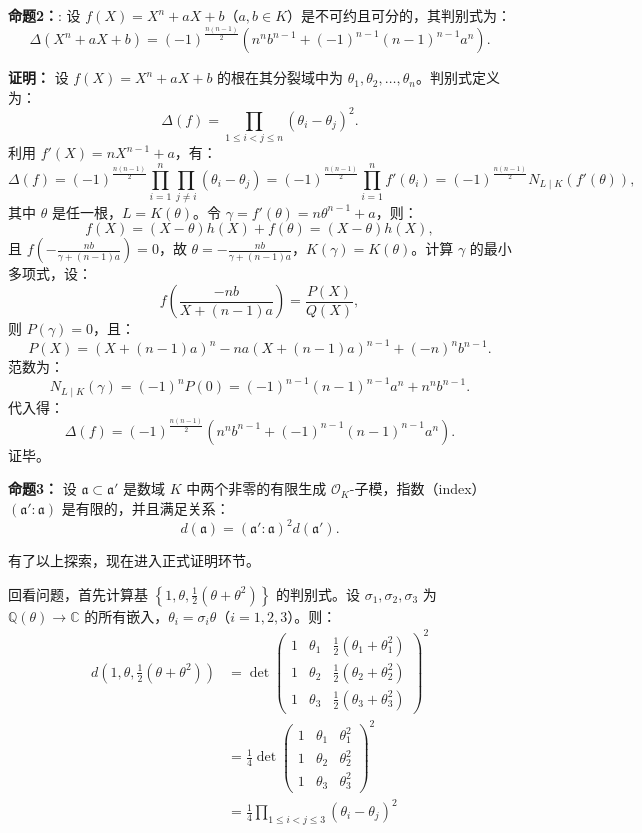 \documentclass[UTF8]{ctexart}
\begin{document}
\begin{enumerate}
\textbf{命题2：}: 设 \( f(X) = X^n + aX + b \)（\( a, b \in K \)）是不可约且可分的，其判别式为：
\[
\Delta(X^n + aX + b) = (-1)^{\frac{n(n-1)}{2}} \left( n^n b^{n-1} + (-1)^{n-1} (n-1)^{n-1} a^n \right).
\]

\textbf{证明：} 设 \( f(X) = X^n + aX + b \) 的根在其分裂域中为 \( \theta_1, \theta_2, \ldots, \theta_n \)。判别式定义为：
\[
\Delta(f) = \prod_{1 \leqslant i < j \leqslant n} (\theta_i - \theta_j)^2.
\]
利用 \( f'(X) = n X^{n-1} + a \)，有：
\[
\Delta(f) = (-1)^{\frac{n(n-1)}{2}} \prod_{i=1}^n \prod_{j \neq i} (\theta_i - \theta_j) = (-1)^{\frac{n(n-1)}{2}} \prod_{i=1}^n f'(\theta_i) = (-1)^{\frac{n(n-1)}{2}} N_{L \mid K}(f'(\theta)),
\]
其中 \( \theta \) 是任一根，\( L = K(\theta) \)。令 \( \gamma = f'(\theta) = n \theta^{n-1} + a \)，则：
\[
f(X) = (X - \theta) h(X) + f(\theta) = (X - \theta) h(X),
\]
且 \( f\left(-\frac{n b}{\gamma + (n-1) a}\right) = 0 \)，故 \( \theta = -\frac{n b}{\gamma + (n-1) a} \)，\( K(\gamma) = K(\theta) \)。计算 \( \gamma \) 的最小多项式，设：
\[
f\left(\frac{-n b}{X + (n-1) a}\right) = \frac{P(X)}{Q(X)},
\]
则 \( P(\gamma) = 0 \)，且：
\[
P(X) = (X + (n-1) a)^n - n a (X + (n-1) a)^{n-1} + (-n)^n b^{n-1}.
\]
范数为：
\[
N_{L \mid K}(\gamma) = (-1)^n P(0) = (-1)^{n-1} (n-1)^{n-1} a^n + n^n b^{n-1} .
\]
代入得：
\[
\Delta(f) = (-1)^{\frac{n(n-1)}{2}} \left( n^n b^{n-1} + (-1)^{n-1} (n-1)^{n-1} a^n \right).
\]
证毕。

\textbf{命题3：} 设 \(\mathfrak{a} \subset \mathfrak{a}' \) 是数域 \( K \) 中两个非零的有限生成 \(\mathcal{O}_K\)-子模，指数（index） \( (\mathfrak{a}' : \mathfrak{a}) \) 是有限的，并且满足关系：
\[
d(\mathfrak{a}) = (\mathfrak{a}' : \mathfrak{a})^2 d(\mathfrak{a}').
\]


有了以上探索，现在进入正式证明环节。

回看问题，首先计算基 \(\left\{1, \theta, \frac{1}{2}(\theta + \theta^2)\right\}\) 的判别式。设 \(\sigma_1, \sigma_2, \sigma_3\) 为 \(\mathbb{Q}(\theta) \to \mathbb{C}\) 的所有嵌入，\(\theta_i = \sigma_i \theta\)（\(i = 1, 2, 3\)）。则：
\[
\begin{aligned}
d\left(1, \theta, \frac{1}{2}(\theta + \theta^2)\right) &= \det\begin{pmatrix}
1 & \theta_1 & \frac{1}{2}(\theta_1 + \theta_1^2) \\
1 & \theta_2 & \frac{1}{2}(\theta_2 + \theta_2^2) \\
1 & \theta_3 & \frac{1}{2}(\theta_3 + \theta_3^2)
\end{pmatrix}^2 \\
&= \frac{1}{4} \det\begin{pmatrix}
1 & \theta_1 & \theta_1^2 \\
1 & \theta_2 & \theta_2^2 \\
1 & \theta_3 & \theta_3^2
\end{pmatrix}^2 \\
&= \frac{1}{4} \prod_{1 \leq i < j \leq 3} (\theta_i - \theta_j)^2
\end{aligned}
\]


\end{enumerate}
\end{document}
